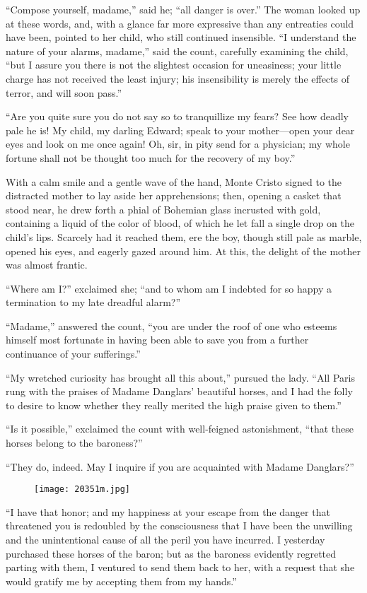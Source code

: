 “Compose yourself, madame,” said he; “all danger is over.” The woman
looked up at these words, and, with a glance far more expressive than
any entreaties could have been, pointed to her child, who still
continued insensible. “I understand the nature of your alarms, madame,”
said the count, carefully examining the child, “but I assure you there
is not the slightest occasion for uneasiness; your little charge has
not received the least injury; his insensibility is merely the effects
of terror, and will soon pass.”

“Are you quite sure you do not say so to tranquillize my fears? See how
deadly pale he is! My child, my darling Edward; speak to your
mother—open your dear eyes and look on me once again! Oh, sir, in pity
send for a physician; my whole fortune shall not be thought too much
for the recovery of my boy.”

With a calm smile and a gentle wave of the hand, Monte Cristo signed to
the distracted mother to lay aside her apprehensions; then, opening a
casket that stood near, he drew forth a phial of Bohemian glass
incrusted with gold, containing a liquid of the color of blood, of
which he let fall a single drop on the child’s lips. Scarcely had it
reached them, ere the boy, though still pale as marble, opened his
eyes, and eagerly gazed around him. At this, the delight of the mother
was almost frantic.

“Where am I?” exclaimed she; “and to whom am I indebted for so happy a
termination to my late dreadful alarm?”

“Madame,” answered the count, “you are under the roof of one who
esteems himself most fortunate in having been able to save you from a
further continuance of your sufferings.”

“My wretched curiosity has brought all this about,” pursued the lady.
“All Paris rung with the praises of Madame Danglars’ beautiful horses,
and I had the folly to desire to know whether they really merited the
high praise given to them.”

“Is it possible,” exclaimed the count with well-feigned astonishment,
“that these horses belong to the baroness?”

“They do, indeed. May I inquire if you are acquainted with Madame
Danglars?”

\begin{figure}[ht]
\texttt{[image: 20351m.jpg]}
\end{figure}

“I have that honor; and my happiness at your escape from the danger
that threatened you is redoubled by the consciousness that I have been
the unwilling and the unintentional cause of all the peril you have
incurred. I yesterday purchased these horses of the baron; but as the
baroness evidently regretted parting with them, I ventured to send them
back to her, with a request that she would gratify me by accepting them
from my hands.”

